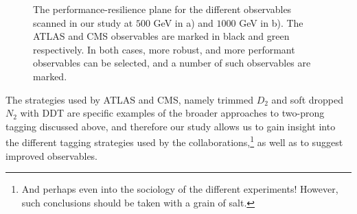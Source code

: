 \documentclass[11pt,letterpaper]{article}
\begin{document}
\begin{figure}
\begin{center}
\qquad
{}
\end{center}
\caption{The performance-resilience plane for the different observables scanned in our study at $500$ GeV in a) and $1000$ GeV in b). The ATLAS and CMS observables are marked in black and green respectively. In both cases, more robust, and more performant observables can be selected, and a number of such observables are marked.
}
\label{fig:phasespace}
\end{figure}

The strategies used by ATLAS and CMS, namely trimmed $D_2$ \cite{Larkoski:2015kga,Larkoski:2014gra} and soft dropped $N_2$ \cite{Moult:2016cvt} with DDT \cite{Dolen:2016kst} are specific examples of the broader approaches to two-prong tagging discussed above, and therefore our study allows us to gain insight into the different tagging strategies used by the collaborations,\footnote{And perhaps even into the sociology of the different experiments! However, such conclusions should be taken with a grain of salt.} as well as to suggest improved observables.
\end{document}
